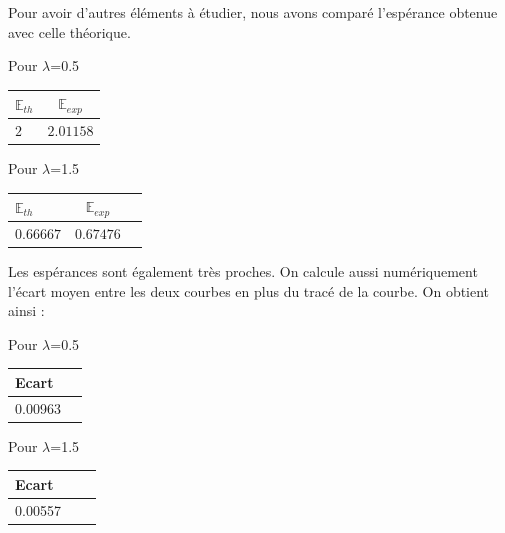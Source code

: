 \documentclass[12,french]{report}
\begin{document}
Pour avoir d'autres éléments à étudier, nous avons comparé l'espérance obtenue avec celle théorique. \\

\begin{minipage}{0.5\textwidth}
		\begin{flushleft} \large\center
			Pour $\lambda$=0.5 \vspace{0.4cm}
			
				\begin{tabular}{|l|c|}
 				\hline
			    $\mathbb{E}_{th}$ & $\mathbb{E}_{exp}$ \\
    			\hline
   				$2$ & $2.01158$ \\
   				\hline
   				\end{tabular}
		\end{flushleft}
	\end{minipage}
	\begin{minipage}{0.4\textwidth}
		\begin{flushright} \large\center
			Pour $\lambda$=1.5 \vspace{0.4cm}
			
				\begin{tabular}{|l|c|r|}
				\hline
			    $\mathbb{E}_{th}$ & $\mathbb{E}_{exp}$ \\
    			\hline
   				$0.66667$ & $0.67476$ \\
   				\hline
   				\end{tabular}
		\end{flushright}
	\end{minipage}\vspace{0.5cm}

Les espérances sont également très proches.
On calcule aussi numériquement l'écart moyen entre les deux courbes en plus du tracé de la courbe. On obtient ainsi :\\

\begin{minipage}{0.5\textwidth}
		\begin{flushleft} \large\center
			Pour $\lambda$=0.5 \vspace{0.4cm}
			
				\begin{tabular}{|l|c|}
 				\hline
			    Ecart \\
    			\hline
   				0.00963\\
   				\hline
   				\end{tabular}
		\end{flushleft}
	\end{minipage}
	\begin{minipage}{0.4\textwidth}
		\begin{flushright} \large\center
			Pour $\lambda$=1.5 \vspace{0.4cm}
			
				\begin{tabular}{|l|c|r|}
				\hline
			    Ecart \\
    			\hline
   				0.00557\\
   				\hline
   				\end{tabular}
		\end{flushright}
	\end{minipage}\vspace{0.5cm}
\end{document}
